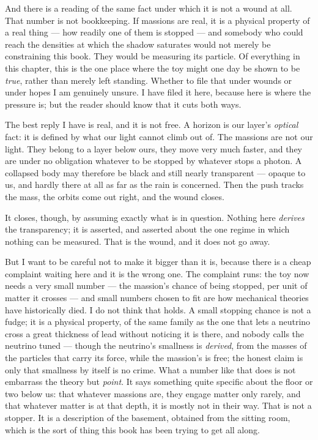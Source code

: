 \documentclass[fontsize=11pt,paper=a4,pagesize=auto,parskip=half-]{scrbook}
\begin{document}
And there is a reading of the same fact under which it is not a wound at all. That number is not bookkeeping. If massions are real, it is a physical property of a real thing --- how readily one of them is stopped --- and somebody who could reach the densities at which the shadow saturates would not merely be constraining this book. They would be measuring its particle. Of everything in this chapter, this is the one place where the toy might one day be shown to be \emph{true}, rather than merely left standing. Whether to file that under wounds or under hopes I am genuinely unsure. I have filed it here, because here is where the pressure is; but the reader should know that it cuts both ways.

The best reply I have is real, and it is not free. A horizon is our layer's \emph{optical} fact: it is defined by what our light cannot climb out of. The massions are not our light. They belong to a layer below ours, they move very much faster, and they are under no obligation whatever to be stopped by whatever stops a photon. A collapsed body may therefore be black and still nearly transparent --- opaque to us, and hardly there at all as far as the rain is concerned. Then the push tracks the mass, the orbits come out right, and the wound closes.

It closes, though, by assuming exactly what is in question. Nothing here \emph{derives} the transparency; it is asserted, and asserted about the one regime in which nothing can be measured. That is the wound, and it does not go away.

But I want to be careful not to make it bigger than it is, because there is a cheap complaint waiting here and it is the wrong one. The complaint runs: the toy now needs a very small number --- the massion's chance of being stopped, per unit of matter it crosses --- and small numbers chosen to fit are how mechanical theories have historically died. I do not think that holds. A small stopping chance is not a fudge; it is a physical property, of the same family as the one that lets a neutrino cross a great thickness of lead without noticing it is there, and nobody calls the neutrino tuned --- though the neutrino's smallness is \emph{derived}, from the masses of the particles that carry its force, while the massion's is free; the honest claim is only that smallness by itself is no crime. What a number like that does is not embarrass the theory but \emph{point}. It says something quite specific about the floor or two below us: that whatever massions are, they engage matter only rarely, and that whatever matter is at that depth, it is mostly not in their way. That is not a stopper. It is a description of the basement, obtained from the sitting room, which is the sort of thing this book has been trying to get all along.
\end{document}
